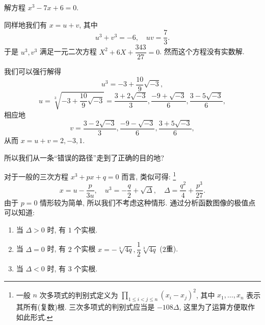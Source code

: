\begin{example}
  解方程 $x^3-7x+6=0$.
\end{example}

\begin{solution}
  同样地我们有 $x=u+v$, 其中
    \[u^3+v^3=-6,\quad uv=\frac73.\]
  于是 $u^3,v^3$ 满足一元二次方程 $X^2+6X+\dfrac{343}{27}=0$.
  然而这个方程没有实数解.

  我们可以强行解得
    \[u^3=-3+\frac{10}9\sqrt{-3},\]
    \[u=\sqrt[3]{-3+\frac{10}9\sqrt{-3}}
      =\frac{3+2\sqrt{-3}}3,\frac{-9+\sqrt{-3}}6,\frac{3-5\sqrt{-3}}6,\]
  相应地
    \[v=\frac{3-2\sqrt{-3}}3,\frac{-9-\sqrt{-3}}6,\frac{3+5\sqrt{-3}}6,\]
  从而 $x=u+v=2,-3,1$.
\end{solution}

所以我们从一条``\alert{错误的路径}''走到了正确的目的地?

对于一般的三次方程 $x^3+px+q=0$ 而言, 类似可得:
\footnote{一般 $n$ 次多项式的判别式定义为 $\prod_{1\le i<j\le n}(x_i-x_j)^2$, 其中 $x_1,\dots,x_n$ 表示其所有(复数)根.
三次多项式的判别式应当是 $-108\Delta$, 这里为了运算方便取作如此形式.}
  \[x=u-\frac p{3u},\quad u^3=-\frac q2+\sqrt{\Delta},\quad \Delta=\frac{q^2}4+\frac{p^3}{27}.\]
由于 $p=0$ 情形较为简单, 所以我们不考虑这种情形.
通过分析函数图像的极值点可以知道:
\begin{enumerate}
  \item 当 $\Delta>0$ 时, 有 $1$ 个实根.
  \item 当 $\Delta=0$ 时, 有 $2$ 个实根 $x=-\sqrt[3]{4q},\dfrac12\sqrt[3]{4q}$ ($2$重).
  \item 当 $\Delta<0$ 时, 有 $3$ 个实根.
\end{enumerate}

